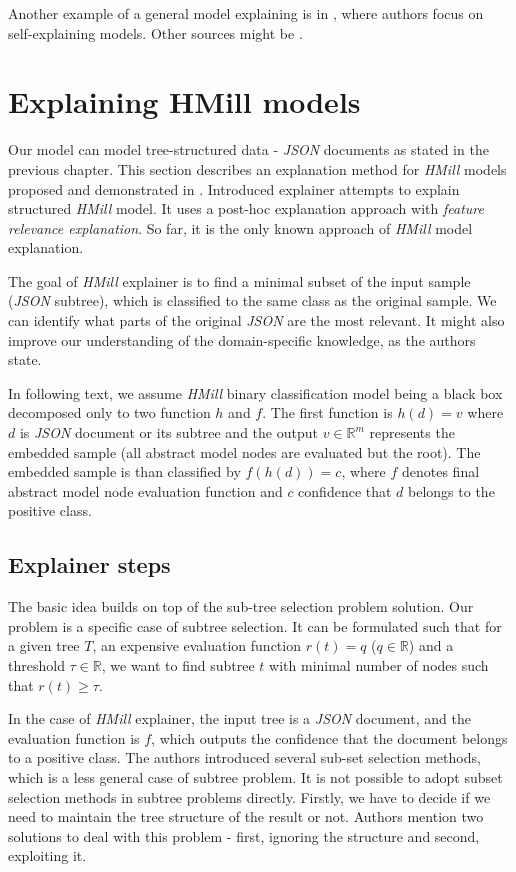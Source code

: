 Another example of a general model explaining is in \cite{Alvarez-Melis2018}, where authors focus on self-explaining models. Other sources might be \cite{Strumbelj2013,Robnik-Sikonja2008,Montavon2018}.

\section{Explaining HMill models}
Our model can model tree-structured data - \emph{JSON} documents as stated in the previous chapter. This section describes an explanation method for \emph{HMill} models proposed and demonstrated in \cite{Pevny2020}. Introduced explainer attempts to explain structured \emph{HMill} model. It uses a post-hoc explanation approach with \emph{feature relevance explanation}. So far, it is the only known approach of \emph{HMill} model explanation.

The goal of \emph{HMill} explainer is to find a minimal subset of the input sample (\emph{JSON} subtree), which is classified to the same class as the original sample. We can identify what parts of the original \emph{JSON} are the most relevant. It might also improve our understanding of the domain-specific knowledge, as the authors state.

In following text, we assume \emph{HMill} binary classification model being a black box decomposed only to two function $h$ and $f$. The first function is $h(d)=v$ where $d$ is \emph{JSON} document or its subtree and the output $v\in\mathbb{R}^{m}$ represents the embedded sample (all abstract model nodes are evaluated but the root). The embedded sample is than classified by $f(h(d))=c$, where $f$ denotes final abstract model node evaluation function and $c$ confidence that $d$ belongs to the positive class.

\subsection{Explainer steps}
The basic idea builds on top of the sub-tree selection problem solution. Our problem is a specific case of subtree selection. It can be formulated such that for a given tree $T$, an expensive evaluation function $r(t)=q$ ($q\in\mathbb{R}$) and a threshold $\tau\in\mathbb{R}$, we want to find subtree $t$ with minimal number of nodes such that $r(t)\geq\tau$. 

In the case of \emph{HMill} explainer, the input tree is a \emph{JSON} document, and the evaluation function is $f$, which outputs the confidence that the document belongs to a positive class. The authors introduced several sub-set selection methods, which is a less general case of subtree problem. It is not possible to adopt subset selection methods in subtree problems directly. Firstly, we have to decide if we need to maintain the tree structure of the result or not. Authors mention two solutions to deal with this problem - first, ignoring the structure and second, exploiting it.

